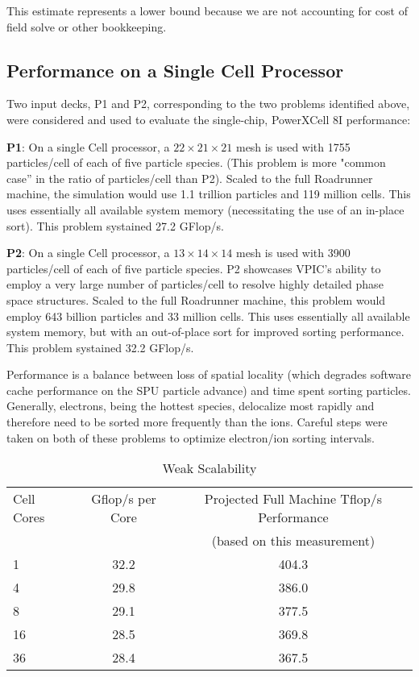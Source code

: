 \documentclass[letter,10pt]{article}
\begin{document}
This estimate represents a lower bound because we are not accounting
for cost of field solve or other bookkeeping. 

\subsection{Performance on a Single Cell Processor}

Two input decks,  P1 and P2, corresponding to the two problems 
identified above, were considered and used to evaluate the single-chip, 
PowerXCell 8I performance: 

\textbf{P1}:  On a single Cell processor, a $22 \times 21 \times 21$ mesh 
is used with 1755 particles/cell of each of five particle species.  
(This problem is 
more "common case'' 
in the ratio of particles/cell than P2).  
Scaled to the full Roadrunner machine, the simulation would 
use 1.1 trillion particles and 119 million cells.  This uses essentially
all available system memory (necessitating the use of an in-place sort). 
This problem systained 27.2 GFlop/s. 


\textbf{P2}:  On a single Cell processor, a $13 \times 14 \times 14$ mesh 
is used with 3900 particles/cell of each of five particle species.  
P2 showcases VPIC's ability to employ a very large number of particles/cell 
to resolve highly detailed phase space structures.  
Scaled to the full Roadrunner machine, this problem would employ 
643 billion particles and 33 million cells. This uses essentially
all available system memory, but with an out-of-place sort for improved 
sorting performance. 
This problem systained 32.2 GFlop/s. 

Performance is a balance between loss of spatial locality (which degrades
software cache performance on the SPU particle advance) and time spent
sorting particles.  Generally, electrons, being the hottest species, 
delocalize most rapidly and therefore need to be sorted more
frequently than the ions.  Careful steps were taken on both of these
problems to optimize electron/ion sorting intervals. 

\begin{table}
\caption{\label{tbl:ASDS_Weak_Scalability}
Weak Scalability}

\begin{center}
\begin{tabular}{l c c}
\hline
\hline
Cell Cores & Gflop/s per Core & Projected Full Machine Tflop/s Performance \\
 & & (based on this measurement) \\
\hline
1 & 32.2 & 404.3 \\
4 & 29.8 & 386.0 \\
8 & 29.1 & 377.5 \\
16 & 28.5 & 369.8 \\
36 & 28.4 & 367.5 \\
\hline
\end{tabular}
\end{center}
\end{table}
\end{document}
